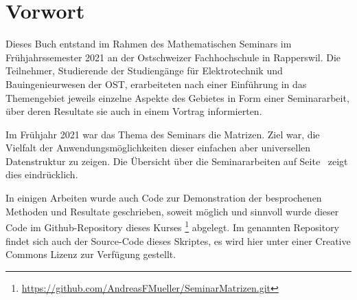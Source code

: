%
%
%
\chapter*{Vorwort}
\rhead{}
Dieses Buch entstand im Rahmen des Mathematischen Seminars
im Frühjahrssemester 2021 an der Ostschweizer Fachhochschule in Rapperswil.
Die Teilnehmer, Studierende der Studiengänge für Elektrotechnik
und Bauingenieurwesen 
der OST, erarbeiteten nach einer Einführung in das Themengebiet jeweils
einzelne Aspekte des Gebietes in Form einer Seminararbeit, über
deren Resultate sie auch in einem Vortrag informierten. 

Im Frühjahr 2021 war das Thema des Seminars die Matrizen.
Ziel war, die Vielfalt der Anwendungsmöglichkeiten dieser einfachen
aber universellen Datenstruktur zu zeigen.
Die Übersicht über die Seminararbeiten auf Seite~\pageref{buch:uebersicht}
zeigt dies eindrücklich.

In einigen Arbeiten wurde auch Code zur Demonstration der 
besprochenen Methoden und Resultate geschrieben, soweit
möglich und sinnvoll wurde dieser Code im Github-Repository
%
dieses Kurses%
\footnote{\url{https://github.com/AndreasFMueller/SeminarMatrizen.git}}
\cite{buch:repo}
abgelegt.
Im genannten Repository findet sich auch der Source-Code dieses
Skriptes, es wird hier unter einer Creative Commons Lizenz
zur Verfügung gestellt.

